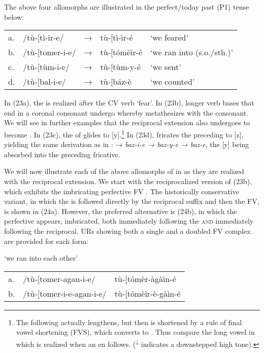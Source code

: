 \documentclass[output=paper,
modfonts
]{LSP/langsci}
\begin{document}
\noindent The above four allomorphs are illustrated in the perfect/today past (P1)
tense below:

\ea \label{ex:hyman:23}\begin{tabular}[t]{@{}lllll}
a. & /tù-{[}tì-ir-e/ & → & tù-{[}tì-ìr-é & `we feared'\\
b. & /tù-{[}tomer-i-e/ & → & tù-{[}tómèìr-é & `we ran into (s.o./sth.)' \\
c. & /tù-{[}tùm-i-e/ & → & tù-{[}tùm-y-é & `we sent' \\
d. & /tù-{[}bal-i-e/ & → & tù-{[}báz-è & `we counted'
\end{tabular}
\z

\noindent In (23a), the   is realized after the CV verb 
`fear'. In (23b), longer verb bases that end in a coronal consonant
undergo  whereby  metathesizes with the consonant.
We will see in further examples that the reciprocal 
extension also undergoes  to become . In
(23c), the  of  glides to {[}y{]}.\footnote{The following
   actually lengthens, but then is shortened by a rule of final
  vowel shortening (FVS), which converts  to
  . Thus compare the long vowel in
  \form{à-{[}lím-y-\textsuperscript{\small{↓}}éé =kò} which is realized when an
  en follows. (\textsuperscript{↓} indicates a downstepped high
  tone).} In (23d),  fricates the preceding  to {[}z{]},
yielding the same derivation as in :  → \emph{baz-i-e →
baz-y-e → baz-e}, the {[}y{]} being absorbed into the preceding
fricative.

We will now illustrate each of the above allomorphs of  in
 as they are realized with the reciprocal extension. We start with
the reciprocalized version of (23b), which exhibits the imbricating
 perfective FV . The historically conservative
variant, in which the  is followed directly by the reciprocal suffix
and then the  FV, is shown in (24a). However, the preferred
alternative is (24b), in which the perfective  appears,
imbricated, both immediately following the  \textsc{and} immediately
following the reciprocal. URs showing both a single and a doubled FV
complex are provided for each form:

\ea `we ran into each other'\\
\begin{tabular}[t]{@{}lll}
a. & /tù-{[}tomer-agan-i-e/ & tù-{[}tómèr-àgàìn-é \\
b. & /tù-{[}tomer-i-e-agan-i-e/ & tù-{[}tómèìr-è-gàìn-é \\
\end{tabular}
\z
\end{document}
